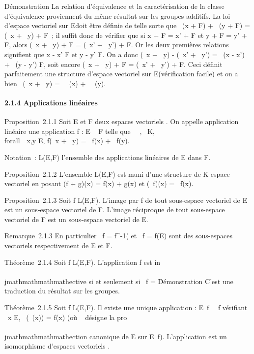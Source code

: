 Démonstration La relation d'équivalence et la caractérisation de la
classe d'équivalence proviennent du même résultat sur les groupes
additifs. La loi d'espace vectoriel sur E\diagupF doit être définie de telle
sorte que \alpha~(x + F) + \beta~(y + F) = (\alpha~x + \beta~y) + F~; il suffit donc de
vérifier que si x + F = x' + F et y + F = y' + F, alors (\alpha~x + \beta~y) + F =
(\alpha~x' + \beta~y') + F. Or les deux premières relations signifient que x - x' \in
F et y - y' \in F. On a donc (\alpha~x + \beta~y) - (\alpha~x' + \beta~y') = \alpha~(x - x') + \beta~(y -
y') \in F, soit encore (\alpha~x + \beta~y) + F = (\alpha~x' + \beta~y') + F. Ceci définit
parfaitement une structure d'espace vectoriel sur E\diagupF (vérification
facile) et on a bien \pi~(\alpha~x + \beta~y) = \alpha~\pi~(x) + \beta~\pi~(y).

\paragraph{2.1.4 Applications linéaires}

Proposition~2.1.1 Soit E et F deux espaces vectoriels . On appelle
application linéaire une application f : E \rightarrow~ F telle que
\forall~\alpha~,\beta~ \in K, \\forall~~x,y \in E,
f(\alpha~x + \beta~y) = \alpha~f(x) + \beta~f(y).

Notation~: L(E,F) l'ensemble des applications linéaires de E dans F.

Proposition~2.1.2 L'ensemble L(E,F) est muni d'une structure de K espace
vectoriel en posant (f + g)(x) = f(x) + g(x) et (\lambda~f)(x) = \lambda~f(x).

Proposition~2.1.3 Soit f \in L(E,F). L'image par f de tout sous-espace
vectoriel de E est un sous-espace vectoriel de F. L'image réciproque de
tout sous-espace vectoriel de F est un sous-espace vectoriel de E.

Remarque~2.1.3 En particulier
\mathrmKer~f =
f^-1(\0\) et
\mathrmIm~f = f(E) sont des
sous-espaces vectoriels respectivement de E et F.

Théorème~2.1.4 Soit f \in L(E,F). L'application f est in\\\\jmathmathmathmathective si et
seulement si \mathrmKer~f =
\0\.

Démonstration C'est une traduction du résultat sur les groupes.

Théorème~2.1.5 Soit f \in L(E,F). Il existe une unique application
\overlinef :
E\diagup\mathrmKer~f
\rightarrow~\mathrmIm~f vérifiant
\forall~x \in E, \overlinef~(\pi~(x)) =
f(x) (où \pi~ désigne la pro\\\\jmathmathmathmathection canonique de E sur
E\diagup\mathrmKer~f).
L'application \overlinef est un isomorphisme
d'espaces vectoriels .

